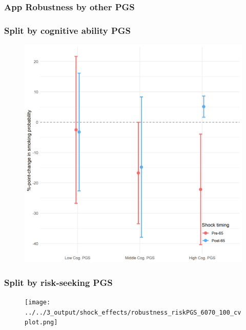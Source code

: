\documentclass[10pt,compress,xcolor=dvipsnames]{beamer}    %
\newcounter{ex}
\newcommand{\1}[1]{\mathrm{1\hspace*{-2.5pt}l}[#1]}	%
\begin{document}
\subsubsection{App Robustness by other PGS}
\begin{frame}
\frametitle{Split by cognitive ability PGS}

\begin{figure}[hbtp]
\centering
\includegraphics[height=0.8\textheight]{../../3_output/shock_effects/robustness_cogPGS_6070_100_cvplot.png}
\label{fig:cogPGS}
\end{figure}
\hyperlink{frame:otherX}{}
\end{frame}

%
%
\begin{frame}
\frametitle{Split by risk-seeking PGS}

\begin{figure}[hbtp]
\centering
\texttt{[image: ../../3\_output/shock\_effects/robustness\_riskPGS\_6070\_100\_cvplot.png]}
\label{fig:riskPGS}
\end{figure}
\hyperlink{frame:otherX}{}
\end{frame}
\end{document}
